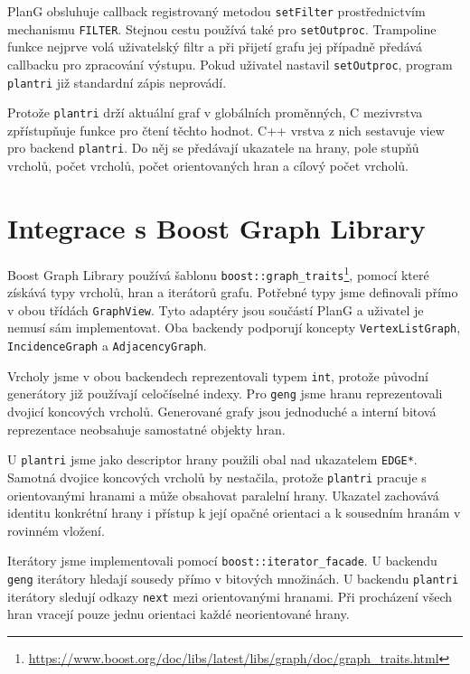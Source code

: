 PlanG obsluhuje callback registrovaný metodou \texttt{setFilter}
prostřednictvím mechanismu \texttt{FILTER}. Stejnou cestu používá také pro
\texttt{setOutproc}. Trampoline funkce nejprve volá uživatelský filtr a při
přijetí grafu jej případně předává callbacku pro zpracování výstupu. Pokud
uživatel nastavil \texttt{setOutproc}, program \texttt{plantri} již standardní
zápis neprovádí.

Protože \texttt{plantri} drží aktuální graf v globálních proměnných, C mezivrstva
zpřístupňuje funkce pro čtení těchto hodnot. C++ vrstva z nich sestavuje view pro
backend \texttt{plantri}. Do něj se předávají ukazatele na hrany, pole stupňů vrcholů, počet vrcholů,
počet orientovaných hran a cílový počet vrcholů.


\section{Integrace s Boost Graph Library}
\label{sec:implementation-boost}

Boost Graph Library používá šablonu \texttt{boost::graph\_traits}\footnote{\url{https://www.boost.org/doc/libs/latest/libs/graph/doc/graph_traits.html}}, pomocí
které získává typy vrcholů, hran a iterátorů grafu. Potřebné typy jsme
definovali přímo v obou třídách \texttt{GraphView}. Tyto adaptéry jsou součástí
PlanG a uživatel je nemusí sám implementovat. Oba backendy podporují koncepty
\texttt{VertexListGraph}, \texttt{IncidenceGraph} a \texttt{AdjacencyGraph}.


Vrcholy jsme v obou backendech reprezentovali typem \texttt{int}, protože
původní generátory již používají celočíselné indexy. Pro \texttt{geng} jsme
hranu reprezentovali dvojicí koncových vrcholů. Generované grafy jsou
jednoduché a interní bitová reprezentace neobsahuje samostatné objekty hran.

U \texttt{plantri} jsme jako descriptor hrany použili obal nad ukazatelem
\texttt{EDGE*}. Samotná dvojice koncových vrcholů by nestačila, protože
\texttt{plantri} pracuje s orientovanými hranami a může obsahovat paralelní
hrany. Ukazatel zachovává identitu konkrétní hrany i přístup k její opačné
orientaci a k sousedním hranám v rovinném vložení.

Iterátory jsme implementovali pomocí \texttt{boost::iterator\_facade}. U backendu
\texttt{geng} iterátory hledají sousedy přímo v bitových množinách. U backendu \texttt{plantri}
iterátory sledují odkazy \texttt{next} mezi orientovanými hranami. Při
procházení všech hran vracejí pouze jednu orientaci každé neorientované hrany.

